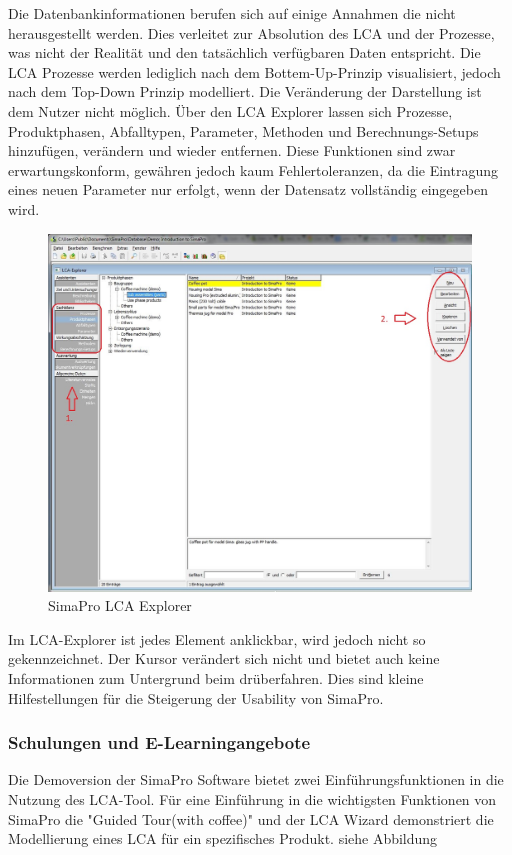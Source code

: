 \documentclass[a4paper, 12pt, twoside, BCOR=20mm, DIV=calc, abstracton, parskip=half*, toc=bibliography, toc=listof, headsepline, footsepline, headings=small, numbers=enddot]{scrreprt}
\begin{document}
Die Datenbankinformationen berufen sich auf einige Annahmen die nicht herausgestellt werden. Dies verleitet zur Absolution des \ac{LCA} und der Prozesse, was nicht der Realität und den tatsächlich verfügbaren Daten entspricht. 
Die \ac{LCA} Prozesse werden lediglich nach dem Bottem-Up-Prinzip visualisiert, jedoch nach dem Top-Down Prinzip modelliert. Die Veränderung der Darstellung ist dem Nutzer nicht möglich.
Über den LCA Explorer lassen sich Prozesse, Produktphasen, Abfalltypen, Parameter, Methoden und Berechnungs-Setups hinzufügen, verändern und wieder entfernen. Diese Funktionen sind zwar erwartungskonform, gewähren jedoch kaum Fehlertoleranzen, da die Eintragung eines neuen Parameter nur erfolgt, wenn der Datensatz vollständig eingegeben wird. 

\begin{figure}
\centering
\includegraphics[width=\textwidth]{Bild/Sima Pro Coffee Prozesse.JPG}
\caption{SimaPro LCA Explorer}
\end{figure}
Im LCA-Explorer ist jedes Element anklickbar, wird jedoch nicht so gekennzeichnet. Der Kursor verändert sich nicht und bietet auch keine Informationen zum Untergrund beim drüberfahren. Dies sind kleine Hilfestellungen für die Steigerung der Usability von SimaPro.  

\subsubsection{Schulungen und E-Learningangebote}
Die Demoversion der SimaPro Software bietet zwei Einführungsfunktionen in die Nutzung des \ac{LCA}-Tool. Für eine Einführung in die wichtigsten Funktionen von SimaPro die "Guided Tour(with coffee)" und der LCA Wizard demonstriert die Modellierung eines \ac{LCA} für ein spezifisches Produkt. siehe Abbildung 
\end{document}
